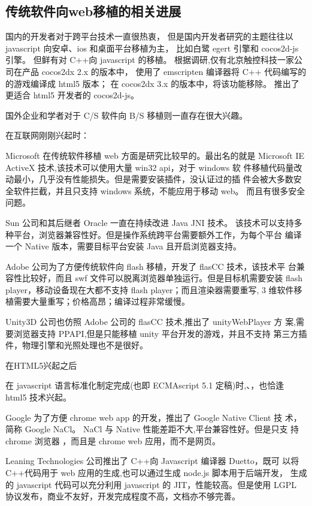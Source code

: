 \subsection{传统软件向web移植的相关进展}

国内的开发者对于跨平台技术一直很热衷，
但是国内开发者研究的主题往往以 javascript 向安卓、ios 和桌面平台移植为主，
比如白鹭 egert 引擎和 cocos2d-js 引擎。
但鲜有对 C++向 javascript 的移植。
根据调研,仅有北京触控科技一家公司在产品 cocos2dx 2.x 的版本中，
使用了 emscripten 编译器将 C++ 代码编写的的游戏编译成 html5 版本；
在 cocos2dx 3.x 的版本中，将该功能移除。
推出了更适合 html5 开发者的 cocos2d-js。

国外企业和学者对于 C/S 软件向 B/S 移植则一直存在很大兴趣。

在互联网刚刚兴起时：

Microsoft 在传统软件移植 web 方面是研究比较早的。最出名的就是
Microsoft IE ActiveX 技术,该技术可以使用大量 win32 api，对于 windows 软
件移植代码量改动最小，几乎没有性能损失。但是需要安装插件，没认证过的插
件会被大多数安全软件拦截，并且只支持 windows 系统，不能应用于移动 web。
而且有很多安全问题。

Sun 公司和其后继者 Oracle 一直在持续改进 Java JNI  技术。
该技术可以支持多种平台，浏览器兼容性好。但是操作系统跨平台需要额外工作，为每个平台
编译一个 Native 版本，需要目标平台安装 Java 且开启浏览器支持。

Adobe 公司为了方便传统软件向 flash 移植，开发了 flasCC 技术，该技术平
台兼容性比较好，而且 swf 文件可以脱离浏览器单独运行。但是目标机需要安装
flash player，移动设备现在大都不支持 flash player；而且渲染器需要重写,
3 维软件移植需要大量重写；价格高昂；编译过程非常缓慢。

Unity3D 公司也仿照 Adobe 公司的 flasCC 技术,推出了 unityWebPlayer 方
案,需要浏览器支持 PPAPI,但是只能移植 unity 平台开发的游戏，并且不支持
第三方插件，物理引擎和光照处理也不是很好。

在HTML5兴起之后

在 javascript 语言标准化制定完成(也即 ECMAscript 5.1 定稿)时,、，也恰逢
html5 技术兴起。

Google 为了方便 chrome web app 的开发，推出了 Google Native Client 技
术，简称 Google NaCl。
NaCl 与 Native 性能差距不大,平台兼容性好。但是只支
持 chrome 浏览器 ，而且是 chrome web 应用，而不是网页。

Leaning Technologies 公司推出了 C++向 Javascript 编译器 Duetto，既可
以将 C++代码用于 web 应用的生成,也可以通过生成 node.js 脚本用于后端开发，
生成的 javascript 代码可以充分利用 javascript 的 JIT，性能较高。但是使用
LGPL 协议发布，商业不友好，开发完成程度不高，文档亦不够完善。

